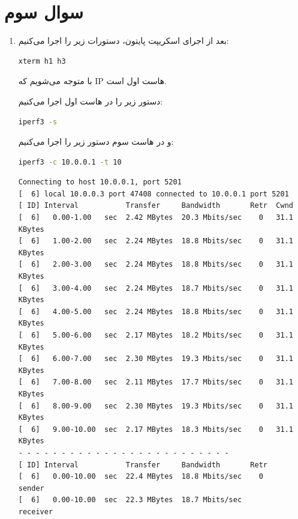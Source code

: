 \documentclass[12pt]{article}
\begin{document}
\newpage
\section*{سوال سوم}

\begin{enumerate}
	\item 
	بعد از اجرای اسکریپت پایتون، دستورات زیر را اجرا می‌کنیم:
	
	\begin{latin}
	\begin{lstlisting}[language=bash]
		xterm h1 h3
	\end{lstlisting}
\end{latin}

با  متوجه‌ می‌شویم که IP هاست اول  است.

دستور زیر را در هاست اول اجرا می‌کنیم:
	
\begin{latin}
	\begin{lstlisting}[language=bash]
		iperf3 -s
	\end{lstlisting}
\end{latin}

و در هاست سوم دستور زیر را اجرا می‌کنیم:
\begin{latin}
	\begin{lstlisting}[language=bash]
		iperf3 -c 10.0.0.1 -t 10
	\end{lstlisting}
\end{latin}

\begin{latin}
	\begin{Verbatim}
Connecting to host 10.0.0.1, port 5201
[  6] local 10.0.0.3 port 47408 connected to 10.0.0.1 port 5201
[ ID] Interval           Transfer     Bandwidth       Retr  Cwnd
[  6]   0.00-1.00   sec  2.42 MBytes  20.3 Mbits/sec    0   31.1 KBytes       
[  6]   1.00-2.00   sec  2.24 MBytes  18.8 Mbits/sec    0   31.1 KBytes       
[  6]   2.00-3.00   sec  2.24 MBytes  18.8 Mbits/sec    0   31.1 KBytes       
[  6]   3.00-4.00   sec  2.24 MBytes  18.7 Mbits/sec    0   31.1 KBytes       
[  6]   4.00-5.00   sec  2.24 MBytes  18.8 Mbits/sec    0   31.1 KBytes       
[  6]   5.00-6.00   sec  2.17 MBytes  18.2 Mbits/sec    0   31.1 KBytes       
[  6]   6.00-7.00   sec  2.30 MBytes  19.3 Mbits/sec    0   31.1 KBytes       
[  6]   7.00-8.00   sec  2.11 MBytes  17.7 Mbits/sec    0   31.1 KBytes       
[  6]   8.00-9.00   sec  2.30 MBytes  19.3 Mbits/sec    0   31.1 KBytes       
[  6]   9.00-10.00  sec  2.17 MBytes  18.3 Mbits/sec    0   31.1 KBytes       
- - - - - - - - - - - - - - - - - - - - - - - - -
[ ID] Interval           Transfer     Bandwidth       Retr
[  6]   0.00-10.00  sec  22.4 MBytes  18.8 Mbits/sec    0             sender
[  6]   0.00-10.00  sec  22.3 MBytes  18.7 Mbits/sec                  receiver
	

\end{Verbatim}
\end{latin}
\end{enumerate}
\end{document}
